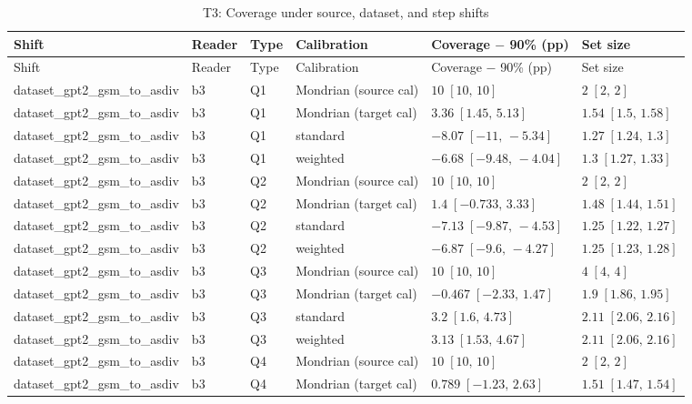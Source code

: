 \begingroup\scriptsize\setlength{\tabcolsep}{3pt}
\begin{longtable}{@{}p{}p{}p{}p{}p{}p{}@{}}
\caption{T3: Coverage under source, dataset, and step shifts}\label{tab:t3-shift}\\
\toprule
Shift & Reader & Type & Calibration & Coverage $-$ 90\% (pp) & Set size \\
\midrule\endfirsthead
\toprule
Shift & Reader & Type & Calibration & Coverage $-$ 90\% (pp) & Set size \\
\midrule\endhead
dataset\_gpt2\_gsm\_to\_asdiv & b3 & Q1 & Mondrian (source cal) & $10\;[10,\,10]$ & $2\;[2,\,2]$ \\
dataset\_gpt2\_gsm\_to\_asdiv & b3 & Q1 & Mondrian (target cal) & $3.36\;[1.45,\,5.13]$ & $1.54\;[1.5,\,1.58]$ \\
dataset\_gpt2\_gsm\_to\_asdiv & b3 & Q1 & standard & $-8.07\;[-11,\,-5.34]$ & $1.27\;[1.24,\,1.3]$ \\
dataset\_gpt2\_gsm\_to\_asdiv & b3 & Q1 & weighted & $-6.68\;[-9.48,\,-4.04]$ & $1.3\;[1.27,\,1.33]$ \\
dataset\_gpt2\_gsm\_to\_asdiv & b3 & Q2 & Mondrian (source cal) & $10\;[10,\,10]$ & $2\;[2,\,2]$ \\
dataset\_gpt2\_gsm\_to\_asdiv & b3 & Q2 & Mondrian (target cal) & $1.4\;[-0.733,\,3.33]$ & $1.48\;[1.44,\,1.51]$ \\
dataset\_gpt2\_gsm\_to\_asdiv & b3 & Q2 & standard & $-7.13\;[-9.87,\,-4.53]$ & $1.25\;[1.22,\,1.27]$ \\
dataset\_gpt2\_gsm\_to\_asdiv & b3 & Q2 & weighted & $-6.87\;[-9.6,\,-4.27]$ & $1.25\;[1.23,\,1.28]$ \\
dataset\_gpt2\_gsm\_to\_asdiv & b3 & Q3 & Mondrian (source cal) & $10\;[10,\,10]$ & $4\;[4,\,4]$ \\
dataset\_gpt2\_gsm\_to\_asdiv & b3 & Q3 & Mondrian (target cal) & $-0.467\;[-2.33,\,1.47]$ & $1.9\;[1.86,\,1.95]$ \\
dataset\_gpt2\_gsm\_to\_asdiv & b3 & Q3 & standard & $3.2\;[1.6,\,4.73]$ & $2.11\;[2.06,\,2.16]$ \\
dataset\_gpt2\_gsm\_to\_asdiv & b3 & Q3 & weighted & $3.13\;[1.53,\,4.67]$ & $2.11\;[2.06,\,2.16]$ \\
dataset\_gpt2\_gsm\_to\_asdiv & b3 & Q4 & Mondrian (source cal) & $10\;[10,\,10]$ & $2\;[2,\,2]$ \\
dataset\_gpt2\_gsm\_to\_asdiv & b3 & Q4 & Mondrian (target cal) & $0.789\;[-1.23,\,2.63]$ & $1.51\;[1.47,\,1.54]$ \\

\end{longtable}
